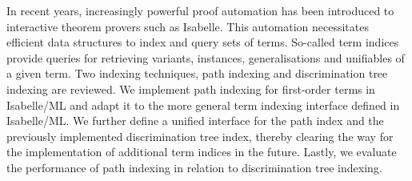 \thispagestyle{empty}
\vspace*{20mm}

\begin{center}
\textbf{{\abstractname}}
\end{center}

\vspace{10mm}
In recent years, increasingly powerful proof automation has been introduced to interactive theorem provers such as Isabelle.
This automation necessitates efficient data structures to index and query sets of terms.
So-called term indices provide queries for retrieving variants, instances, generalisations and unifiables of a given term.
Two indexing techniques, path indexing and discrimination tree indexing are reviewed.
We implement path indexing for first-order terms in Isabelle/ML and adapt it to the more general term indexing interface defined in Isabelle/ML.
We further define a unified interface for the path index and the previously implemented discrimination tree index, thereby clearing the way for the implementation of additional term indices in the future.
Lastly, we evaluate the performance of path indexing in relation to discrimination tree indexing.

\cleardoublepage{}
